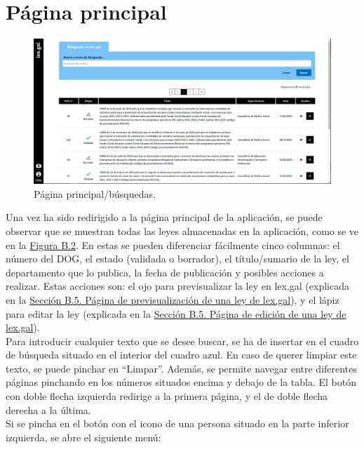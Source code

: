 \section{Página principal}
\label{PPrincipal}

\begin{figure}[H]
\centerline{\includegraphics[width=15cm]{figuras/manualUsuario/Principal.PNG}}
\caption{Página principal/búsquedas.}
\label{enlacePPrincipal}
\end{figure}

Una vez ha sido redirigido a la página principal de la aplicación, se puede observar que se muestran todas las leyes almacenadas en la aplicación, como se ve en la \hyperref[enlacePPrincipal]{Figura B.2}. En estas se pueden diferenciar fácilmente cinco columnas: el número del DOG, el estado (validada o borrador), el título/sumario de la ley, el departamento que lo publica, la fecha de publicación y posibles acciones a realizar. Estas acciones son: el ojo para previsualizar la ley en lex.gal (explicada en la \hyperref[PPrevisualizacionLexGal]{Sección B.5. Página de previsualización de una ley de lex.gal}), y el lápiz para editar la ley (explicada en la \hyperref[PEdicionLexGal]{Sección B.5. Página de edición de una ley de lex.gal}). 
\\

Para introducir cualquier texto que se desee buscar, se ha de insertar en el cuadro de búsqueda situado en el interior del cuadro azul. En caso de querer limpiar este texto, se puede pinchar en ``Limpar''. Además, se permite navegar entre diferentes páginas pinchando en los números situados encima y debajo de la tabla. El botón con doble flecha izquierda redirige a la primera página, y el de doble flecha derecha a la última.
\\

Si se pincha en el botón con el icono de una persona situado en la parte inferior izquierda, se abre el siguiente menú:

